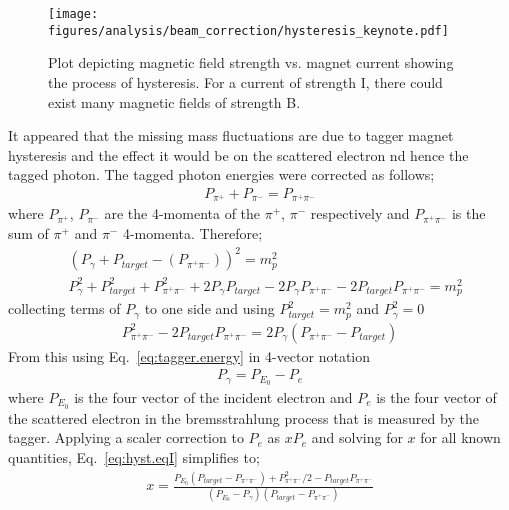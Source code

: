   \begin{figure}[h!]\begin{center}
  \texttt{[image: \\figures/analysis/beam\_correction/hysteresis\_keynote.pdf]}
  \caption[Plot depicting magnetic field strength vs. magnet current showing the process of hysteresis]{\label{fig:hyst}Plot depicting magnetic field strength vs. magnet current showing the process of hysteresis. For a current of strength I, there could exist many magnetic fields of strength B.}
  \end{center}\end{figure}
  \FloatBarrier
  It appeared that the  missing mass fluctuations are due to tagger magnet hysteresis and the effect it would be on the scattered electron nd hence the tagged photon. The tagged photon energies were corrected as follows;
  \begin{align}
  P_{\pi^+} + P_{\pi^-} = P_{\pi^+ \pi^-} \nonumber
  \end{align}
  where $P_{\pi^+}$, $P_{\pi^-}$ are the 4-momenta of the $\pi^+$, $\pi^-$ respectively and $P_{\pi^+ \pi^-}$ is the sum of $\pi^+$ and $\pi^-$ 4-momenta.
  Therefore;
  \begin{align}
  &(P_{\gamma} + P_{target} - (P_{\pi^+\pi^-}))^2 = m_p^2 \\
  & P_{\gamma}^2 + P_{target}^2 + P_{\pi^+\pi^-}^2 + 2P_{\gamma}P_{target} - 2P_{\gamma}P_{\pi^+\pi^-} - 2P_{target}P_{\pi^+\pi^-}= m_p^2
  \end{align}
  collecting terms of $P_{\gamma}$ to one side and using $P_{target}^2 = m_p^2 $ and $P_{\gamma}^2 = 0$
  \begin{align}\label{eq:hyst.eqI}
  P_{\pi^+\pi^-}^2 - 2P_{target}P_{\pi^+\pi^-}= 2P_{\gamma}(P_{\pi^+\pi^-} - P_{target})
  \end{align}
  From this using Eq.~\ref{eq:tagger.energy} in 4-vector notation
  \begin{align}\label{eq:tagger.energyII}
  P_{\gamma} = P_{E_0} - P_{e}\nonumber
  \end{align}
  where $P_{E_0}$ is the four vector of the incident electron and $P_{e}$ is the four vector of the scattered electron in the bremsstrahlung process that is measured by the tagger. Applying a scaler correction to $P_{e}$ as $xP_{e}$ and solving for $x$ for all known quantities, Eq.~\ref{eq:hyst.eqI} simplifies to;
  \begin{align}
  x= \frac{P_{E_0}(P_{target}-P_{\pi^+\pi^-}) + P_{\pi^+\pi^-}^2/2  - P_{target}P_{\pi^+\pi^-}}{(P_{E_0} - P_{\gamma})(P_{target} - P_{\pi^+\pi^-})}
  \end{align}

